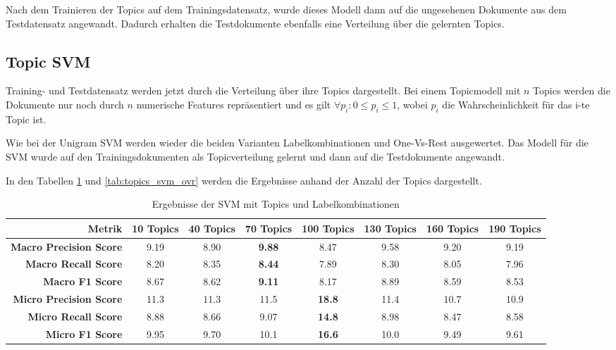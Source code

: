 Nach dem Trainieren der Topics auf dem Trainingsdatensatz, wurde dieses Modell dann auf die ungesehenen Dokumente aus
dem Testdatensatz angewandt.
Dadurch erhalten die Testdokumente ebenfalls eine Verteilung über die gelernten Topics.

\subsection{Topic SVM}
\label{sub:topic_svm}
Training- und Testdatensatz werden jetzt durch die Verteilung über ihre Topics dargestellt.
Bei einem Topicmodell mit $n$ Topics
werden die Dokumente nur noch durch $n$ numerische Features repräsentiert und es gilt $\forall p_i: 0 \le p_i \le 1 $, wobei $p_i$
die Wahrscheinlichkeit für das i-te Topic ist.

Wie bei der Unigram SVM werden wieder die beiden Varianten Labelkombinationen und One-Vs-Rest ausgewertet.
Das Modell für die SVM wurde auf den Trainingsdokumenten als Topicverteilung gelernt und dann auf die Testdokumente angewandt.

In den Tabellen \ref{tab:topics_svm_labelcombs} und \ref{tab:topics_svm_ovr} werden die Ergebnisse anhand der Anzahl der Topics
dargestellt.

\begin{table}[h]
    \begin{tabular}{r|ccccccc}
        \tiny\textbf{Metrik} & \tiny\textbf{10 Topics} &\tiny \textbf{40 Topics} &\tiny \textbf{70 Topics} &\tiny \textbf{100 Topics} & \tiny \textbf{130 Topics} &  \tiny \textbf{160 Topics} &  \tiny \textbf{190 Topics} \\
        \hline
        \tiny \textbf{Macro Precision Score}  & \tiny 9.19 & \tiny 8.90& \tiny \textbf{9.88}&\tiny 8.47&\tiny 9.58&\tiny 9.20&\tiny 9.19\\
        \tiny \textbf{Macro Recall Score}     & \tiny 8.20 & \tiny 8.35& \tiny \textbf{8.44}&\tiny 7.89&\tiny 8.30&\tiny 8.05&\tiny 7.96\\
        \tiny \textbf{Macro F1 Score}        & \tiny 8.67 & \tiny 8.62& \tiny \textbf{9.11}&\tiny 8.17&\tiny 8.89&\tiny 8.59&\tiny 8.53\\
        \tiny \textbf{Micro Precision Score} & \tiny 11.3 & \tiny 11.3& \tiny 11.5&\tiny \textbf{18.8}&\tiny 11.4&\tiny 10.7&\tiny 10.9\\
        \tiny \textbf{Micro Recall Score}    & \tiny 8.88 & \tiny 8.66& \tiny 9.07&\tiny \textbf{14.8}&\tiny 8.98&\tiny 8.47&\tiny 8.58\\
        \tiny \textbf{Micro F1 Score}        & \tiny 9.95 & \tiny 9.70& \tiny 10.1&\tiny \textbf{16.6}&\tiny 10.0&\tiny 9.49&\tiny 9.61\\
    \end{tabular}
    \caption{Ergebnisse der SVM mit Topics und Labelkombinationen}
    \label{tab:topics_svm_labelcombs}
\end{table}

